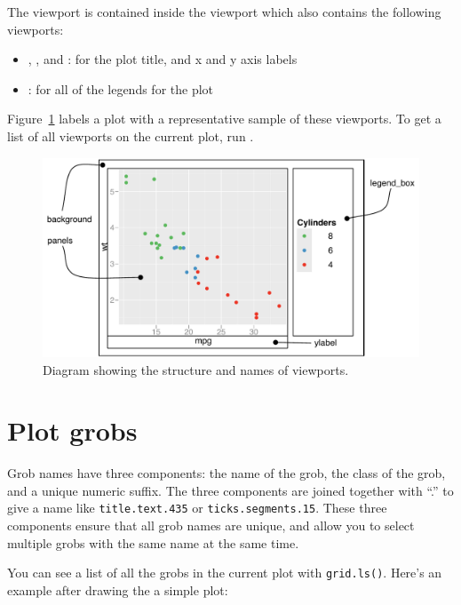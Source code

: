 The  viewport is contained inside the  viewport which also contains the following viewports:

\begin{itemize}
  \item {}, , and : for the plot title, and x and y axis labels
  \item {}: for all of the legends for the plot
\end{itemize}

\noindent Figure~\ref{fig:viewports} labels a plot with a representative sample of these viewports.  To get a list of all viewports on the current plot, run .

\begin{figure}[htbp]
  \centering
    \includegraphics[width=\textwidth]{grid-viewports}
  \caption{Diagram showing the structure and names of viewports.}
  \label{fig:viewports}
\end{figure}

\section{Plot grobs}
\label{sec:plot-grobs}

Grob names have three components: the name of the grob, the class of the grob, and a unique numeric suffix.  The three components are joined together with ``.'' to give a name like {\tt title.text.435} or {\tt ticks.segments.15}.  These three components ensure that all grob names are unique, and allow you to select multiple grobs with the same name at the same time.

You can see a list of all the grobs in the current plot with {\tt grid.ls()}.  Here's an example after drawing the a simple plot:

